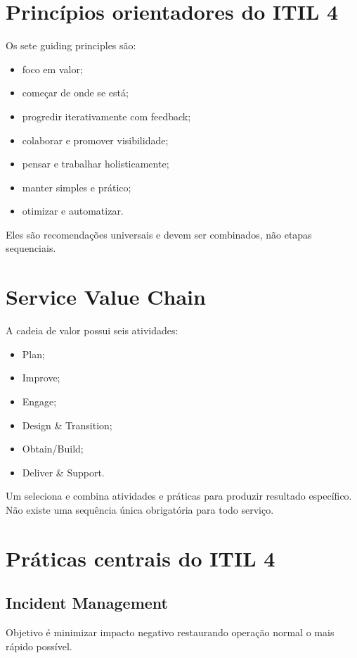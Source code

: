 \section{Princípios orientadores do ITIL 4}

Os sete guiding principles são:
\begin{itemize}
\item foco em valor;
\item começar de onde se está;
\item progredir iterativamente com feedback;
\item colaborar e promover visibilidade;
\item pensar e trabalhar holisticamente;
\item manter simples e prático;
\item otimizar e automatizar.
\end{itemize}

Eles são recomendações universais e devem ser combinados, não etapas sequenciais.

\section{Service Value Chain}

A cadeia de valor possui seis atividades:
\begin{itemize}
\item Plan;
\item Improve;
\item Engage;
\item Design \& Transition;
\item Obtain/Build;
\item Deliver \& Support.
\end{itemize}

Um  seleciona e combina atividades e práticas para produzir resultado específico. Não existe uma sequência única obrigatória para todo serviço.

\section{Práticas centrais do ITIL 4}

\subsection{Incident Management}

Objetivo é minimizar impacto negativo restaurando operação normal o mais rápido possível.

